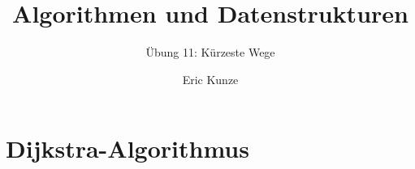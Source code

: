 \documentclass{beamer}
\begin{document}
	\title{Algorithmen und Datenstrukturen}
	\subtitle{Übung 11: Kürzeste Wege}
	\author{Eric Kunze}
	\date{}

	\maketitle






\section{Dijkstra-Algorithmus}
\end{document}
